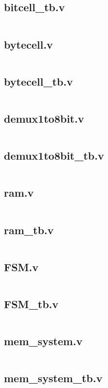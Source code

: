 \subsection*{bitcell_tb.v}
\inputminted{verilog}{../verilog_mem8x8_m_tri_state_buffer/bitcell_tb.v}

\subsection*{bytecell.v}
\inputminted{verilog}{../verilog_mem8x8_m_tri_state_buffer/bytecell.v}

\subsection*{bytecell_tb.v}
\inputminted{verilog}{../verilog_mem8x8_m_tri_state_buffer/bytecell_tb.v}

\subsection*{demux1to8bit.v}
\inputminted{verilog}{../verilog_mem8x8_m_tri_state_buffer/demux1to8bit.v}

\subsection*{demux1to8bit_tb.v}
\inputminted{verilog}{../verilog_mem8x8_m_tri_state_buffer/demux1to8bit_tb.v}

\subsection*{ram.v}
\inputminted{verilog}{../verilog_mem8x8_m_tri_state_buffer/ram.v}

\subsection*{ram_tb.v}
\inputminted{verilog}{../verilog_mem8x8_m_tri_state_buffer/ram_tb.v}

\subsection*{FSM.v}
\inputminted{verilog}{../verilog_mem8x8_m_tri_state_buffer/FSM.v}

\subsection*{FSM_tb.v}
\inputminted{verilog}{../verilog_mem8x8_m_tri_state_buffer/FSM_tb.v}

\subsection*{mem_system.v}
\inputminted{verilog}{../verilog_mem8x8_m_tri_state_buffer/mem_system.v}

\subsection*{mem_system_tb.v}
\inputminted{verilog}{../verilog_mem8x8_m_tri_state_buffer/mem_system_tb.v}

